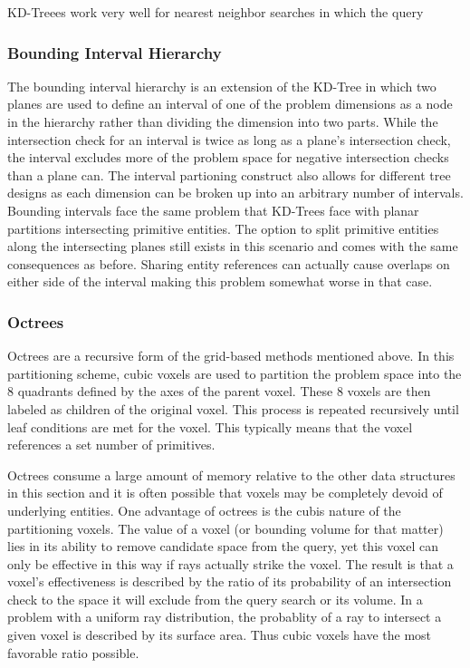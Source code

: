 \documentclass[10pt, a4paper]{article}
\begin{document}
KD-Treees work very well for nearest neighbor searches in which the query




\subsubsection{Bounding Interval Hierarchy}

The bounding interval hierarchy is an extension of the KD-Tree in which two planes are used to define an interval of one of the problem dimensions as a node in the hierarchy rather than dividing the dimension into two parts. While the intersection check for an interval is twice as long as a plane's intersection check, the interval excludes more of the problem space for negative intersection checks than a plane can. The interval partioning construct also allows for different tree designs as each dimension can be broken up into an arbitrary number of intervals. Bounding intervals face the same problem that KD-Trees face with planar partitions intersecting primitive entities. The option to split primitive entities along the intersecting planes still exists in this scenario and comes with the same consequences as before. Sharing entity references can actually cause overlaps on either side of the interval making this problem somewhat worse in that case.


\subsubsection{Octrees}

Octrees are a recursive form of the grid-based methods mentioned above. In this partitioning scheme, cubic voxels are used to partition the problem space into the 8 quadrants defined by the axes of the parent voxel. These 8 voxels are then labeled as children of the original voxel. This process is repeated recursively until leaf conditions are met for the voxel. This typically means that the voxel references a set number of primitives.

Octrees consume a large amount of memory relative to the other data structures in this section and  it is often possible that voxels may be completely devoid of underlying entities. One advantage of octrees is the cubis nature of the partitioning voxels. The value of a voxel (or bounding volume for that matter) lies in its ability to remove candidate space from the query, yet this voxel can only be effective in this way if rays actually strike the voxel. The result is that a voxel's effectiveness is described by the ratio of its probability of an intersection check to the space it will exclude from the query search or its volume. In a problem with a uniform ray distribution, the probablity of a ray to intersect a given voxel is described by its surface area. Thus cubic voxels have the most favorable ratio possible.
\end{document}
